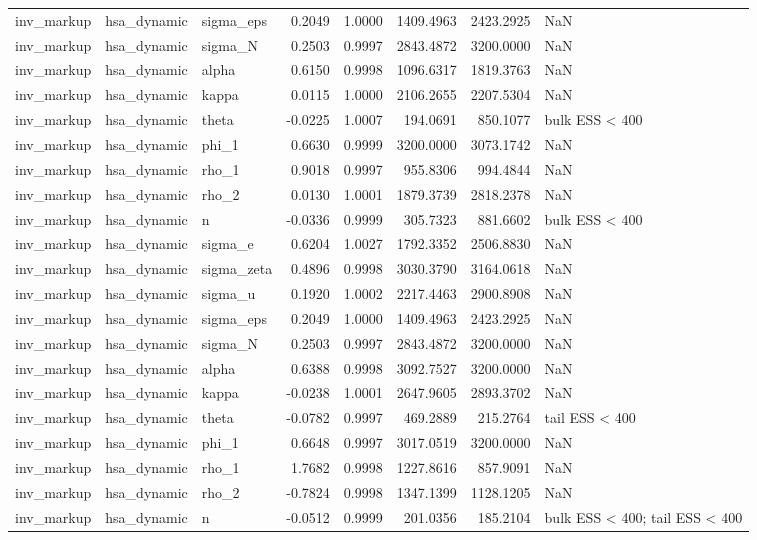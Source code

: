 \begin{tabular}{lllrrrrl}
inv\_markup & hsa\_dynamic & sigma\_eps & 0.2049 & 1.0000 & 1409.4963 & 2423.2925 & NaN \\
inv\_markup & hsa\_dynamic & sigma\_N & 0.2503 & 0.9997 & 2843.4872 & 3200.0000 & NaN \\
inv\_markup & hsa\_dynamic & alpha & 0.6150 & 0.9998 & 1096.6317 & 1819.3763 & NaN \\
inv\_markup & hsa\_dynamic & kappa & 0.0115 & 1.0000 & 2106.2655 & 2207.5304 & NaN \\
inv\_markup & hsa\_dynamic & theta & -0.0225 & 1.0007 & 194.0691 & 850.1077 & bulk ESS < 400 \\
inv\_markup & hsa\_dynamic & phi\_1 & 0.6630 & 0.9999 & 3200.0000 & 3073.1742 & NaN \\
inv\_markup & hsa\_dynamic & rho\_1 & 0.9018 & 0.9997 & 955.8306 & 994.4844 & NaN \\
inv\_markup & hsa\_dynamic & rho\_2 & 0.0130 & 1.0001 & 1879.3739 & 2818.2378 & NaN \\
inv\_markup & hsa\_dynamic & n & -0.0336 & 0.9999 & 305.7323 & 881.6602 & bulk ESS < 400 \\
inv\_markup & hsa\_dynamic & sigma\_e & 0.6204 & 1.0027 & 1792.3352 & 2506.8830 & NaN \\
inv\_markup & hsa\_dynamic & sigma\_zeta & 0.4896 & 0.9998 & 3030.3790 & 3164.0618 & NaN \\
inv\_markup & hsa\_dynamic & sigma\_u & 0.1920 & 1.0002 & 2217.4463 & 2900.8908 & NaN \\
inv\_markup & hsa\_dynamic & sigma\_eps & 0.2049 & 1.0000 & 1409.4963 & 2423.2925 & NaN \\
inv\_markup & hsa\_dynamic & sigma\_N & 0.2503 & 0.9997 & 2843.4872 & 3200.0000 & NaN \\
inv\_markup & hsa\_dynamic & alpha & 0.6388 & 0.9998 & 3092.7527 & 3200.0000 & NaN \\
inv\_markup & hsa\_dynamic & kappa & -0.0238 & 1.0001 & 2647.9605 & 2893.3702 & NaN \\
inv\_markup & hsa\_dynamic & theta & -0.0782 & 0.9997 & 469.2889 & 215.2764 & tail ESS < 400 \\
inv\_markup & hsa\_dynamic & phi\_1 & 0.6648 & 0.9997 & 3017.0519 & 3200.0000 & NaN \\
inv\_markup & hsa\_dynamic & rho\_1 & 1.7682 & 0.9998 & 1227.8616 & 857.9091 & NaN \\
inv\_markup & hsa\_dynamic & rho\_2 & -0.7824 & 0.9998 & 1347.1399 & 1128.1205 & NaN \\
inv\_markup & hsa\_dynamic & n & -0.0512 & 0.9999 & 201.0356 & 185.2104 & bulk ESS < 400; tail ESS < 400 \\

\end{tabular}

